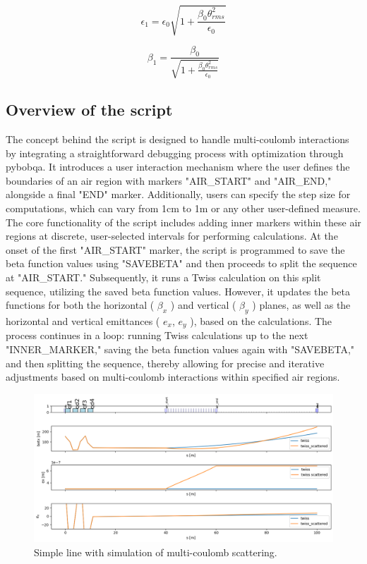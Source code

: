 \documentclass[a4paper,
               biblatex,     %
               ]{jacow}
\begin{document}
\[
\epsilon_{1} = \epsilon_{0}\sqrt{1+\frac{\beta_{0}\theta_{rms}^{2}}{\epsilon_{0}}}
\]

\[
\beta_{1}=\frac{\beta_{0}}{\sqrt{1+\frac{\beta_{0}\theta_{rms}^{2}}{\epsilon_{0}}}}
\]


\subsection{Overview of the script}

The concept behind the script is designed to handle multi-coulomb interactions by integrating a straightforward debugging process with optimization through pybobqa. It introduces a user interaction mechanism where the user defines the boundaries of an air region with markers "AIR\_START" and "AIR\_END," alongside a final "END" marker. Additionally, users can specify the step size for computations, which can vary from 1cm to 1m or any other user-defined measure. The core functionality of the script includes adding inner markers within these air regions at discrete, user-selected intervals for performing calculations. At the onset of the first "AIR\_START" marker, the script is programmed to save the beta function values using "SAVEBETA" and then proceeds to split the sequence at "AIR\_START." Subsequently, it runs a Twiss calculation on this split sequence, utilizing the saved beta function values. However, it updates the beta functions for both the horizontal ( $\beta_{x}$ ) and vertical ( $\beta_{y}$ ) planes, as well as the horizontal and vertical emittances ( $e_{x}$, $e_{y}$ ), based on the calculations. The process continues in a loop: running Twiss calculations up to the next "INNER\_MARKER," saving the beta function values again with "SAVEBETA," and then splitting the sequence, thereby allowing for precise and iterative adjustments based on multi-coulomb interactions within specified air regions.

\begin{figure}[!htb]
   \centering
   \includegraphics*[width=1.0\columnwidth]{air_scattering_1.png}
   \caption{Simple line with simulation of multi-coulomb scattering.}
   \label{fig:simple_line}
\end{figure}
\end{document}
